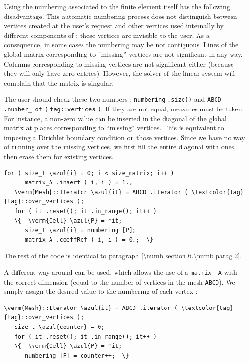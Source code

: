 Using the numbering associated to the finite element itself has the following disadvantage.
This automatic numbering process does not distinguish between vertices created at the user's
request and other vertices used internally by different components of {\maniFEM};
these vertices are invisible to the user.
As a consequence, in some cases the numbering may be not contiguous.
Lines of the global matrix corresponding to ``missing'' vertices are not significant in any way.
Columns corresponding to missing vertices are not significant either (because they will only
have zero entries).
However, the solver of the linear system will complain that the matrix is singular.

The user should check these two numbers : {\small\tt numbering} {\small\tt.size()} and
{\small\tt ABCD}  {\small\tt .number\_\,of}  {\small\tt (}
{\small\tt\textcolor{tag}{tag}::vertices}  {\small\tt )}.
If they are not equal, measures must be taken.
For instance, a non-zero value can be inserted in the diagonal of the global matrix
at places corresponding to ``missing'' vertices.
This is equivalent to imposing a Dirichlet boundary condition on those vertices.
Since we have no way of running over the missing vertices, we first fill the entire
diagonal with ones, then erase them for existing vertices.

\begin{Verbatim}[commandchars=\\\{\},formatcom=\small\tt,frame=single,
   label=parag-\ref{\numb section 6.\numb parag 4}.cpp,rulecolor=\color{coment},
   baselinestretch=0.94,framesep=2mm                                            ]
   for ( size_t \azul{i} = 0; i < size_matrix; i++ )
      matrix_A .insert ( i, i ) = 1.;
   \verm{Mesh}::Iterator \azul{it} = ABCD .iterator ( \textcolor{tag}{tag}::over_vertices );
   for ( it .reset(); it .in_range(); it++ )
   \{  \verm{Cell} \azul{P} = *it;
      size_t \azul{i} = numbering [P];
      matrix_A .coeffRef ( i, i ) = 0.;  \}
\end{Verbatim}

The rest of the code is identical to paragraph \ref{\numb section 6.\numb parag 2}.

A different way around can be used, which allows the use of a {\small\tt matrix\_\,A}
with the correct dimension (equal to the number of vertices in the mesh {\small\tt ABCD}).
We simply assign the desired value to the numbering of each vertex :

\begin{Verbatim}[commandchars=\\\{\},formatcom=\small\tt,frame=single,
   rulecolor=\color{coment},baselinestretch=0.94,framesep=2mm          ]
   \verm{Mesh}::Iterator \azul{it} = ABCD .iterator ( \textcolor{tag}{tag}::over_vertices );
   size_t \azul{counter} = 0;
   for ( it .reset(); it .in_range(); it++ )
   \{  \verm{Cell} \azul{P} = *it;
      numbering [P] = counter++;  \}
\end{Verbatim}

